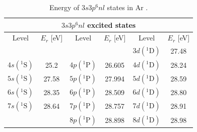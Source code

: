 \begin{table}[]
	\centering
	\begin{tabular}{|cc|cc|cc|}
		\hline \hline
		\multicolumn{6}{|c|}{$3s3p^6nl$ excited states}                                               \\ \hline
		Level        & $E_r$ {[}eV{]} & Level        & $E_r$ {[}eV{]} & Level        & $E_r$ {[}eV{]} \\ \hline
		&                &              &                & $3d({}^1\mathrm{D})$ & 27.48          \\
		$4s( {}^1\mathrm{S})$ & 25.2           & $4p({}^1\mathrm{P})$ & 26.605         & $4d({}^1\mathrm{D})$   & 28.24          \\
		$5s( {}^1\mathrm{S})$ & 27.58          & $5p({}^1\mathrm{P})$ & 27.994         & $5d({}^1\mathrm{D})$ & 28.59          \\
		$6s( {}^1\mathrm{S})$ & 28.35          & $6p({}^1\mathrm{P})$ & 28.509         & $6d( {}^1\mathrm{D})$ & 28.80          \\
		$7s( {}^1\mathrm{S})$ & 28.64          & $7p({}^1\mathrm{P})$ & 28.757         & $7d({}^1\mathrm{D})$   & 28.91          \\
		&                & $8p({}^1\mathrm{P})$ & 28.898         & $8d({}^1\mathrm{D})$ & 28.98          \\ \hline \hline
	\end{tabular}
	\caption[Energy of $3s3p^6nl$ states in Ar]{Energy of $3s3p^6nl$ states in Ar \cite{caretteMulticonfigurationalHartreeFockClosecoupling2013, brionThresholdElectronImpact1970, fryarAnalysisEjectedelectronSpectra1976, juretaEnergyAngularAnalysis2016, ogurtsovAutoIonizationStatesArgon1970, sorensenArgon3sAutoionization1994}.}
	\label{tab:all_states}
\end{table}

